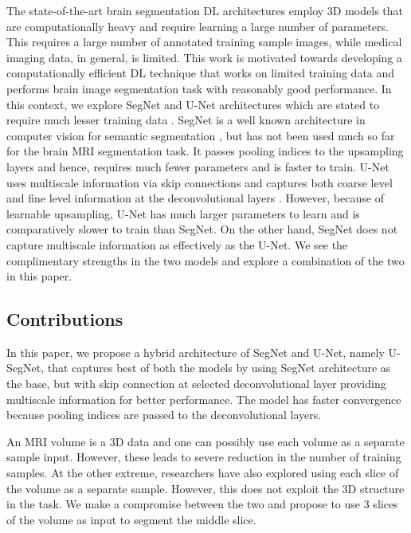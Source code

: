 \documentclass{article}
\begin{document}
The state-of-the-art brain segmentation DL architectures employ 3D models that are computationally heavy and require learning a large number of parameters. This requires a large number of annotated training sample images, while medical imaging data, in general, is limited. This work is motivated towards developing a computationally efficient DL technique that works on limited training data and performs brain image segmentation task with reasonably good performance. In this context, we explore SegNet and U-Net architectures which are stated to require much lesser training data \cite{badrinarayanan2017segnet,u-net}.  SegNet is a well known architecture in computer vision for semantic segmentation \cite{badrinarayanan2017segnet}, but has not been used much so far for the brain MRI segmentation task. It passes pooling indices to the upsampling layers and hence, requires much fewer parameters and is faster to train. U-Net uses multiscale information via skip connections and captures both coarse level and fine level information at the deconvolutional layers \cite{u-net}. However, because of learnable upsampling, U-Net has much larger parameters to learn and is comparatively slower to train than SegNet. On the other hand, SegNet does not capture multiscale information as effectively as the U-Net. We see the complimentary strengths in the two models and explore a combination of the two in this paper. 

\subsection{Contributions}

In this paper, we propose a hybrid architecture of SegNet and U-Net, namely U-SegNet, that captures best of both the models by using SegNet architecture as the base, but with skip connection at selected deconvolutional layer providing multiscale information for better performance. The model has faster convergence because pooling indices are passed to the deconvolutional layers. 

An MRI volume is a 3D data and one can possibly use each volume as a separate sample input. However, these leads to severe reduction in the number of training samples. At the other extreme, researchers have also explored using each slice of the volume as a separate sample. However, this does not exploit the 3D structure in the task. We make a compromise between the two and propose to use 3 slices of the volume as input to segment the middle slice. 
\end{document}
